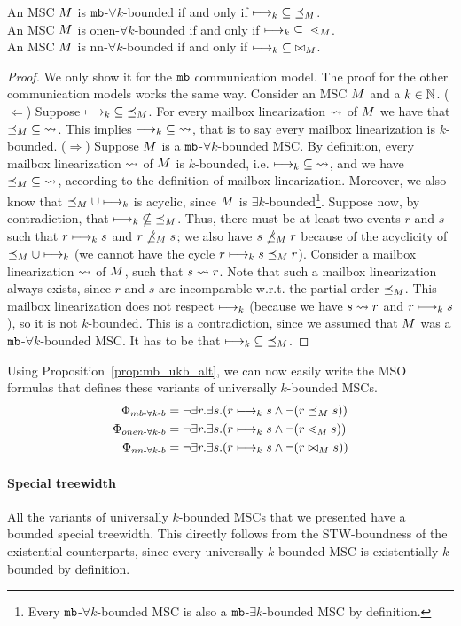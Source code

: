 \begin{proposition}\label{prop:mb_ukb_alt}
	An MSC $M$ is $\mathtt{mb}$-$\forall k$-bounded if and only if $\longmapsto_k \;\subseteq\; \preceq_M$.\\
	An MSC $M$ is onen-$\forall k$-bounded if and only if $\longmapsto_k \;\subseteq\; \lessdot_M$.\\
	An MSC $M$ is nn-$\forall k$-bounded if and only if $\longmapsto_k \;\subseteq\; \bowtie_M$.
\end{proposition}
\begin{proof}
	We only show it for the $\mathtt{mb}$ communication model. The proof for the other communication models works the same way. Consider an MSC $M$ and a $k \in \mathbb{N}$.\newline
	($\Leftarrow$) Suppose $\longmapsto_k \;\subseteq\; \preceq_M$. For every mailbox linearization $\rightsquigarrow$ of $M$ we have that $\preceq_M \;\subseteq\; \rightsquigarrow$. This implies $\longmapsto_k \;\subseteq\; \rightsquigarrow$, that is to say every mailbox linearization is $k$-bounded.\newline
	($\Rightarrow$) Suppose $M$ is a $\mathtt{mb}$-$\forall k$-bounded MSC. By definition, every mailbox linearization $\rightsquigarrow$ of $M$ is $k$-bounded, i.e. $\longmapsto_k \;\subseteq\; \rightsquigarrow$, and we have $\preceq_M \;\subseteq\; \rightsquigarrow$, according to the definition of mailbox linearization. Moreover, we also know that $\preceq_M \cup \longmapsto_k$ is acyclic, since $M$ is $\exists k$-bounded\footnote{Every $\mathtt{mb}$-$\forall k$-bounded MSC is also a $\mathtt{mb}$-$\exists k$-bounded MSC by definition.}. Suppose now, by contradiction, that $\longmapsto_k \;\nsubseteq\; \preceq_M$. Thus, there must be at least two events $r$ and $s$ such that $r \longmapsto_k s$ and $r \npreceq_M s$; we also have $s \npreceq_M r$ because of the acyclicity of $\preceq_M \cup \longmapsto_k$ (we cannot have the cycle $r \longmapsto_k s \preceq_M r$). Consider a mailbox linearization $\rightsquigarrow$  of $M$, such that $s \rightsquigarrow r$. Note that such a mailbox linearization always exists, since $r$ and $s$ are incomparable w.r.t. the partial order $\preceq_M$. This mailbox linearization does not respect $\longmapsto_k$ (because we have $s \rightsquigarrow r$ and $r \longmapsto_k s$), so it is not $k$-bounded. This is a contradiction, since we assumed that $M$ was a $\mathtt{mb}$-$\forall k$-bounded MSC. It has to be that $\longmapsto_k \;\subseteq\; \preceq_M$.
\end{proof}

Using Proposition~\ref{prop:mb_ukb_alt}, we can now easily write the MSO formulas that defines these variants of universally $k$-bounded MSCs.
\begin{align*} 
	\Phi_{mb\text{-}\forall k\text{-}b} &= \neg \exists r.\exists s.(r \longmapsto_k s \wedge \neg(r \preceq_M s)) \\ 
	\Phi_{onen\text{-}\forall k\text{-}b} &= \neg \exists r.\exists s.(r \longmapsto_k s \wedge \neg(r \lessdot_M s)) \\ 
	\Phi_{nn\text{-}\forall k\text{-}b} &= \neg \exists r.\exists s.(r \longmapsto_k s \wedge \neg(r \bowtie_M s))
\end{align*}


\paragraph*{Special treewidth}

All the variants of universally $k$-bounded MSCs that we presented have a bounded special treewidth. This directly follows from the STW-boundness of the existential counterparts, since every universally $k$-bounded MSC is existentially $k$-bounded by definition.
